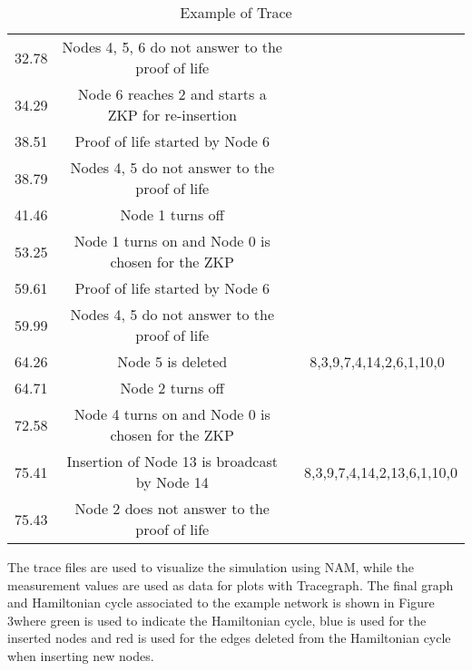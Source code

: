 \documentclass[conference]{IEEEtran}
\begin{document}
\begin{table*}[htb]
\begin{center}
\begin{tabular}{|c|c|c|}
32.78 & \scriptsize{Nodes 4, 5, 6 do not answer to the proof of life}  & \\

34.29 &\scriptsize{ Node 6 reaches 2 and starts a ZKP for re-insertion } & \\

38.51 & \scriptsize{Proof of life started by Node 6} & \\

38.79 & \scriptsize{Nodes 4, 5 do not answer to the proof of life} & \\

41.46 & \scriptsize{Node 1 turns off} & \\

53.25 & \scriptsize{Node 1  turns on and Node 0 is chosen for the ZKP }& \\

59.61 &\scriptsize{ Proof of life started by Node 6 }& \\

59.99 & \scriptsize{Nodes 4, 5 do not answer to the proof of life }& \\

64.26 & \scriptsize{ Node 5 is deleted} &
\scriptsize{8,3,9,7,4,14,2,6,1,10,0}\\

64.71 & \scriptsize{Node 2 turns off} & \\

72.58 & \scriptsize{Node 4  turns on and Node 0 is chosen for the ZKP}  & \\

75.41 & \scriptsize{Insertion of Node 13 is broadcast by Node 14 } & \
\scriptsize{8,3,9,7,4,14,2,13,6,1,10,0 }  \\

75.43 & \scriptsize{Node 2 does not answer to the proof of life } &
\\

 \hline
\end{tabular}
\caption{Example of Trace} \label{tab:Trace}
\end{center}
 
\end{table*}

The trace files are used to visualize the simulation using NAM,
while the measurement values are used as data for plots with
Tracegraph. The final graph and Hamiltonian cycle associated to
the example network is shown in Figure 3where green is used to indicate the Hamiltonian cycle, blue is used for
the inserted nodes and red is used for the
 edges deleted from the Hamiltonian cycle when inserting new
 nodes.
\end{document}
